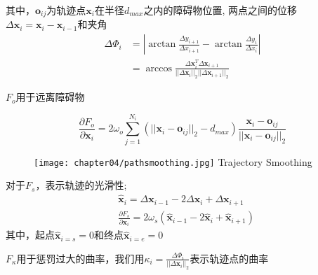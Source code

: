 其中，$\bm{o}_{ij}$为轨迹点$\bm{x}_i$在半径$d_{max}$之内的障碍物位置, 两点之间的位移
$\Delta \bm{x}_{i} = \bm{x}_i - \bm{x}_{i-1}$和夹角
\begin{equation} 
  \begin{aligned}
    \Delta \Phi_i
    &= | \arctan \frac{\Delta y_{i+1}}{\Delta x_{i+1}} - \arctan \frac{\Delta y_{i}}{\Delta x_{i}}| \\
    &= \arccos \frac{\Delta \bm{x}_i^T \Delta \bm{x}_{i+1} }
    {||\Delta \bm{x}_i||_2 ||\Delta \bm{x}_{i+1}||_2}
  \end{aligned}
\end{equation}

 $F_o$用于远离障碍物

\begin{equation} 
  \frac{\partial F_o}{\partial \bm{x}_i} = 2 \omega_o \sum_{j=1}^{N_i} 
  \left( || \bm{x}_{i} - \bm{o}_{ij}||_2 - d_{max} \right) \frac{\bm{x}_{i} - \bm{o}_{ij}}
  {|| \bm{x}_{i} - \bm{o}_{ij}||_2}
\end{equation}

\begin{figure}[!htp]
  \centering
  \texttt{[image: chapter04/pathsmoothing.jpg]}
    {Trajectory Smoothing}
  \label{fig:rscurve}
\end{figure}

对于$F_s$，表示轨迹的光滑性;
\begin{equation} 
  \begin{aligned}
    &\hat{\bm{x}}_i = \Delta \bm{x}_{i-1} -2 \Delta \bm{x}_i + \Delta \bm{x}_{i+1} \\
    &\frac{\partial F_s}{\partial \bm{x}_i} = 2 \omega_s 
    \left( \hat{\bm{x}}_{i-1} -2 \hat{\bm{x}}_{i} + \hat{\bm{x}}_{i+1}  \right) 
  \end{aligned}
\end{equation}
其中，起点$\hat{\bm{x}}_{i=s}=0$和终点$\hat{\bm{x}}_{i=e}=0$

$F_{\kappa}$用于惩罚过大的曲率，我们用$\kappa_i = \frac{\Delta \Phi_i }{|| \Delta \bm{x}_i ||_2} $表示轨迹点的曲率


